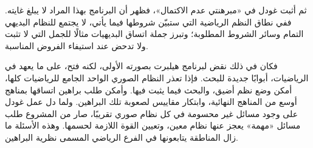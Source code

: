 \documentclass[../../../include/open-logic-section]{subfiles}
\begin{document}
ثم أثبت غودل في  «مبرهنتي عدم الاكتمال»، فظهر أن
البرنامج بهذا المراد لا يبلغ غايته. ففي نطاق النظم الرياضية
التي ستبيّن شروطها فيما يأتي، لا يجتمع للنظام البديهي التمام
وسائر الشروط المطلوبة؛ وتبرز جملة اتساق البديهيات مثالًا
للجمل التي لا تثبت ولا تدحض عند استيفاء الفروض المناسبة.

فكان في ذلك نقض لبرنامج هيلبرت بصورته الأولى، لكنه فتح،
على ما يعهد في الرياضيات، أبوابًا جديدة للبحث. فإذا تعذر
النظام الصوري الواحد الجامع للرياضيات كلها، أمكن وضع نظم
أضيق، والبحث فيما يثبت فيها. وأمكن طلب براهين اتساقها
بمناهج أوسع من المناهج النهائية، وابتكار مقاييس لصعوبة
تلك البراهين. ولما دل عمل غودل على وجود مسائل غير محسومة
في كل نظام صوري تقريبًا، صار من المشروع طلب مسائل «مهمة»
يعجز عنها نظام معين، وتعيين القوة اللازمة لحسمها.
وهذه الأسئلة ما زال المناطقة يتابعونها في الفرع الرياضي
المسمى نظرية البراهين.
\end{document}
